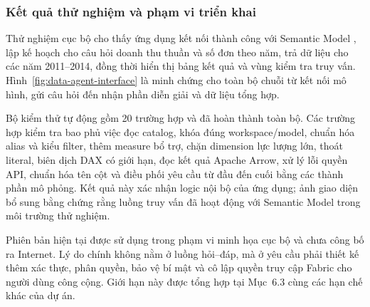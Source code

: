\subsubsection{Kết quả thử nghiệm và phạm vi triển khai}

Thử nghiệm cục bộ cho thấy ứng dụng kết nối thành công với Semantic Model , lập kế hoạch cho câu hỏi doanh thu thuần và số đơn theo năm, trả dữ liệu cho các năm 2011--2014, đồng thời hiển thị bảng kết quả và vùng kiểm tra truy vấn. Hình~\ref{fig:data-agent-interface} là minh chứng cho toàn bộ chuỗi từ kết nối mô hình, gửi câu hỏi đến nhận phần diễn giải và dữ liệu tổng hợp.

Bộ kiểm thử tự động gồm 20 trường hợp và đã hoàn thành toàn bộ. Các trường hợp kiểm tra bao phủ việc đọc catalog, khóa đúng workspace/model, chuẩn hóa alias và kiểu filter, thêm measure bổ trợ, chặn dimension lực lượng lớn, thoát literal, biên dịch DAX có giới hạn, đọc kết quả Apache Arrow, xử lý lỗi quyền API, chuẩn hóa tên cột và điều phối yêu cầu từ đầu đến cuối bằng các thành phần mô phỏng. Kết quả này xác nhận logic nội bộ của ứng dụng; ảnh giao diện bổ sung bằng chứng rằng luồng truy vấn đã hoạt động với Semantic Model trong môi trường thử nghiệm.

Phiên bản hiện tại được sử dụng trong phạm vi minh họa cục bộ và chưa công bố ra Internet. Lý do chính không nằm ở luồng hỏi--đáp, mà ở yêu cầu phải thiết kế thêm xác thực, phân quyền, bảo vệ bí mật và cô lập quyền truy cập Fabric cho người dùng công cộng. Giới hạn này được tổng hợp tại Mục~6.3 cùng các hạn chế khác của dự án.
